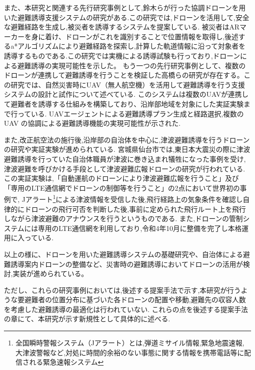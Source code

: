 また、本研究と関連する先行研究事例として,鈴木らが行った協調ドローンを用いた避難誘導支援システムの研究がある\cite{suzuki2020drone}.この研究では,ドローンを活用して,安全な避難経路を生成し,被災者を誘導するシステムを提案している.
被災者はARマーカーを身に着け、ドローンがこれを識別することで位置情報を取得し,後述するa*アルゴリズムにより避難経路を探索し,計算した軌道情報に沿って対象者を誘導するものである.この研究では実機による誘導試験も行っており,ドローンによる避難誘導の実現可能性を示した。
もう一つの先行研究事例として、複数のドローンが連携して避難誘導を行うことを検証した高橋らの研究が存在する\cite{takahashi2018uav}。この研究では、自然災害時にUAV（無人航空機）を活用して避難誘導を行う支援システムの設計と試作について述べている.
このシステムは複数のUAVが連携して避難者を誘導する仕組みを構築しており、沿岸部地域を対象にした実証実験まで行っている. UAVエージェントによる避難誘導プラン生成と経路選択,複数の UAV の協調による避難誘導機能の実現可能性が示された.\par

また,改正航空法の施行後,沿岸部の自治体を中心に,津波避難誘導を行うドローンの研究や実証実験が進められている.
宮城県仙台市では,東日本大震災の際に津波避難誘導を行っていた自治体職員が津波に巻き込まれ犠牲になった事例を受け,津波避難を呼びかける手段として津波避難広報ドローンの研究が行われている\cite{sendai_tsunami_drone}.この実証実験は,「自動運航のドローンにより津波避難広報を行うこと」及び「専用のLTE通信網でドローンの制御等を行うこと」の2点において世界初の事例で,
Jアラート\footnote{全国瞬時警報システム（Jアラート）とは,弾道ミサイル情報,緊急地震速報,大津波警報など,対処に時間的余裕のない事態に関する情報を携帯電話等に配信される緊急速報システム}による津波情報を受信した後,飛行経路上の気象条件を確認し自律的にドローンの飛行可否を判断した後,事前に定められた飛行ルート上を飛行しながら津波避難のアナウンスを行うというものである.
また,ドローンの管制システムには専用のLTE通信網を利用しており,令和4年10月に整備を完了し本格運用に入っている.\par


以上の様に、ドローンを用いた避難誘導システムの基礎研究や、自治体による避難誘導案内ドローンの整備など、災害時の避難誘導においてドローンの活用が検討,実装が進められている。\par

ただし、これらの研究事例においては,後述する提案手法で示す,本研究が行うような要避難者の位置分布に基づいた各ドローンの配置や移動,避難先の収容人数を考慮した避難誘導の最適化は行われていない.
これらの点を後述する提案手法の章にて、本研究が示す新規性として具体的に述べる.

